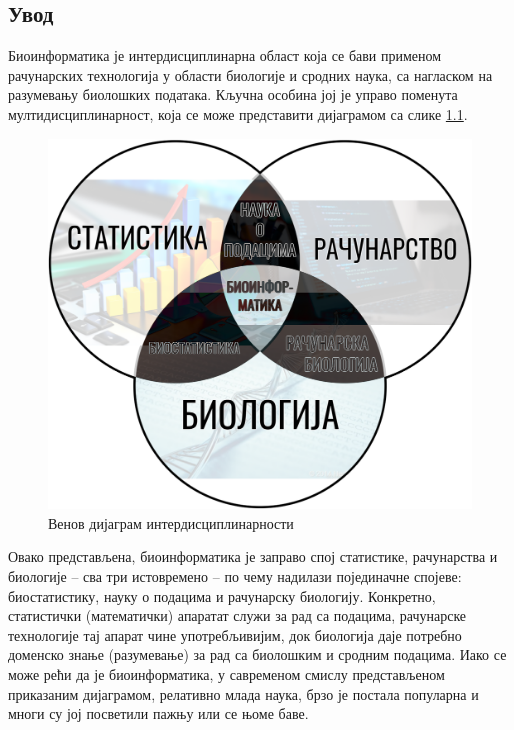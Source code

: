 \documentclass[12pt,oneside]{memoir}
\begin{document}
\begin{CJK}{UTF8}{ipxm}
\frontmatter
\naslovna
\komisija
\apstrakt
\tableofcontents*

\mainmatter

\chapter{Увод}
Биоинформатика је интердисциплинарна област која се бави применом рачунарских технологија у области биологије и сродних наука, са нагласком на разумевању биолошких података. Кључна особина јој је управо поменута мултидисциплинарност, која се може представити дијаграмом са слике \ref{fig:venn}.

\begin{figure}[!ht]
  \centering
  \includegraphics[width=.75\textwidth]{bioinformatika.png}
  \caption{Венов дијаграм интердисциплинарности\cite{venn}}
  \label{fig:venn}
\end{figure}

Овако представљена, биоинформатика је заправо спој статистике, рачунарства и биологије -- сва три истовремено -- по чему надилази појединачне спојеве: биостатистику, науку о подацима и рачунарску биологију. Конкретно, статистички (математички) апаратат служи за рад са подацима, рачунарске технологије тај апарат чине употребљивијим, док биологија даје потребно доменско знање (разумевање) за рад са биолошким и сродним подацима. Иако се може рећи да је биоинформатика, у савременом смислу представљеном приказаним дијаграмом, релативно млада наука, брзо је постала популарна и многи су јој посветили пажњу или се њоме баве\cite{fauziyyah2019, cmero2015, ufpr}.


\end{CJK}
\end{document}
